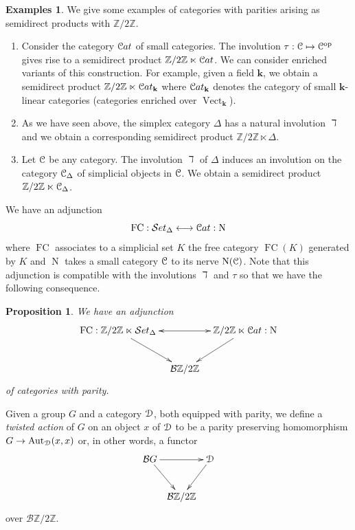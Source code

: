 \documentclass[english,11pt,leqno]{article}
\def\Aut{\operatorname{Aut}\nolimits}
\def\on{\operatorname}
\def\Vect{\operatorname{Vect}}
\def\k{\mathbf{k}}
\def\op{{\operatorname{op}}}
\def\N{\operatorname{N}}
\def\Cat{{\mathcal Cat}}
\def\Set{ {\mathcal Set}}
\def\FC{\operatorname{FC}}
\def\B{ {\EuScript B}}
\def\C{{\EuScript C}}
\def\D{{\EuScript D}}
\def\Set{ {\mathcal Set}}
\def\FC{\on{FC}}
\def\Zt{\mathbb{Z}/2\mathbb{Z}}
\def\BZt{{\mathcal B}\mathbb{Z}/2\mathbb{Z}}
\def\B{{\mathcal B}}
\def\Cat{{\EuScript Cat}}
\newtheorem{prop}[thm]{Proposition}
\theoremstyle{definition}
\newtheorem{exas}[thm]{Examples}
\theoremstyle{remark}
\numberwithin{equation}{section}
\begin{document}
\begin{exas} \label{exas:semi} We give some examples of categories with parities arising as semidirect products with
	$\Zt$.
	\begin{enumerate}
		\item Consider the category $\Cat$ of small categories. The involution $\tau: \C
			\mapsto \C^{\op}$ gives rise to a semidirect product $\Zt \ltimes \Cat$.
			We can consider enriched variants of this construction. For example, given a
			field $\k$, we obtain a semidirect product $\Zt \ltimes \Cat_\k$ where $\Cat_\k$ denotes the
			category of small $\k$-linear categories (categories enriched over $\Vect_\k$).
		\item As we have seen above, the simplex category $\Delta$ has a natural involution
			$\daleth$ and we obtain a corresponding semidirect product $\Zt \ltimes \Delta$.
		\item Let $\C$ be any category. The involution $\daleth$ of $\Delta$ induces an
			involution on the category $\C_{\Delta}$ of simplicial objects in $\C$. We
			obtain a semidirect product $\Zt \ltimes \C_{\Delta}$.
	\end{enumerate}
\end{exas}

We have an adjunction 
\[
		\FC: \Set_{\Delta} \longleftrightarrow \Cat: \N
\]
where $\FC$ associates to a simplicial set $K$ the free category $\FC(K)$ generated by $K$ and $\N$ takes a
small category $\C$ to its nerve $\N(\C)$. Note that this adjunction is compatible with the
involutions $\daleth$ and $\tau$ so that we have the following consequence.

\begin{prop} We have an adjunction
\[
	\xymatrix@C=2ex{
		\FC: \Zt \ltimes \Set_{\Delta} \ar[dr]\ar@{<->}[rr]&  &\ar[dl] \Zt \ltimes \Cat: \N\\
		 & \B \Zt &  
	}
\]
of categories with parity.
\end{prop}

Given a group $G$ and a category $\D$, both equipped with parity, we define a {\em twisted 
action} of $G$ on an object $x$ of $\D$ to be a parity preserving homomorphism $G \to
\Aut_{\D}(x,x)$ or, in other words, a functor
\[
	\xymatrix@C=1ex{ \B G \ar[rr]\ar[dr] & & \D\ar[dl]\\
	& \BZt & }
\]
over $\BZt$.
\end{document}

